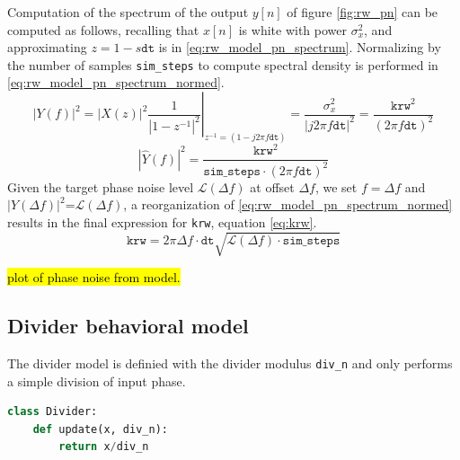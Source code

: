 Computation of the spectrum of the output $y[n]$ of figure \ref{fig:rw_pn} can be computed as follows, recalling that $x[n]$ is white with power $\sigma_x^2$, and approximating $z = 1-s\mathtt{dt}$ is in \ref{eq:rw_model_pn_spectrum}. Normalizing by the number of samples \texttt{sim\_steps} to compute spectral density is performed in \ref{eq:rw_model_pn_spectrum_normed}.
\begin{equation}\label{eq:rw_model_pn_spectrum}
|Y(f)|^{2} = \left.|X(z)|^{2}\frac{1}{|1-z^{-1}|^2}\right|_{z^{-1}=(1-j2\pi f\mathtt{dt})} = \frac{\sigma_x^2}{|j2\pi f\mathtt{dt}|^2} = \frac{\texttt{krw}^2}{(2\pi f\mathtt{dt})^2}
\end{equation}
\begin{equation}\label{eq:rw_model_pn_spectrum_normed}
|\hat Y(f)|^{2} = \frac{\texttt{krw}^2}{\mathtt{sim\_steps}\cdot(2\pi f\mathtt{dt})^2}
\end{equation}
Given the target phase noise level $\mathcal{L}(\Delta f)$ at offset $\Delta f$, we set $f=\Delta f$ and $|Y(\Delta f)|^{2}$=$\mathcal{L}(\Delta f)$, a reorganization of \ref{eq:rw_model_pn_spectrum_normed} results in the final expression for \texttt{krw}, equation \ref{eq:krw}.
\begin{equation}\label{eq:krw}
\texttt{krw} = 2\pi \Delta f\cdot\mathtt{dt}\sqrt{\mathcal{L}(\Delta f)\cdot\mathtt{sim\_steps}}
\end{equation}


\hl{plot of phase noise from model.}

\subsection{Divider behavioral model}
The divider model is definied with the divider modulus \texttt{div\_n} and only performs a simple division of input phase. 
\begin{lstlisting}[language={Python}, caption={Divider behavioral model.}, label={div_code}]
class Divider:
	def update(x, div_n):
		return x/div_n
\end{lstlisting}

